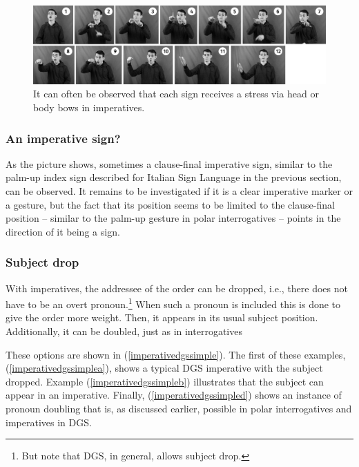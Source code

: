 \begin{figure}[bt]
\centering
	\includegraphics[width=1.0\textwidth]{imperativeheadmovementsw.jpg}
	\caption{It can often be observed that each sign receives a stress via head or body bows in imperatives.}
	\label{fig:headmoveimp}
\end{figure}

\subsubsection{An imperative sign?}
As the picture shows, sometimes a clause-final imperative sign, similar to the palm-up index sign described for Italian Sign Language in the previous section, can be observed. It remains to be investigated if it is a clear imperative marker or a gesture, but the fact that its position seems to be limited to the clause-final position -- similar to the palm-up gesture in polar interrogatives -- points in the direction of it being a sign. 

\subsubsection{Subject drop}
With imperatives, the addressee of the order can be dropped, i.e., there does not have to be an overt pronoun.\footnote{ But note that DGS, in general, allows subject drop.} When such a pronoun is included this is done to give the order more weight. Then, it appears in its usual subject position. Additionally, it can be doubled, just as in interrogatives 

These options are shown in (\ref{imperativedgssimple}). The first of these examples, (\ref{imperativedgssimplea}), shows a typical DGS imperative with the subject dropped. Example (\ref{imperativedgssimpleb}) illustrates that the subject can appear in an imperative. Finally, (\ref{imperativedgssimpled}) shows an instance of pronoun doubling that is, as discussed earlier, possible in polar interrogatives and imperatives in DGS.

